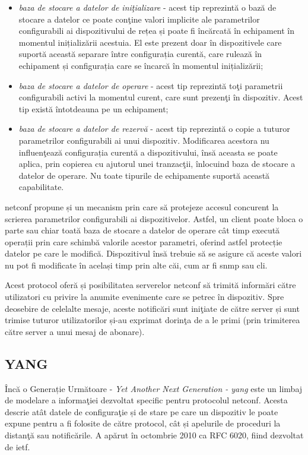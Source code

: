 \begin{itemize}
	\item \textit{baza de stocare a datelor de iniţializare} - acest tip reprezintă o bază de stocare a datelor ce poate conţine valori implicite ale parametrilor configurabili ai dispozitivului de rețea și poate fi încărcată în echipament în momentul inițializării acestuia. El este prezent doar în dispozitivele care suportă această separare între configurația curentă, care rulează în echipament și configurația care se încarcă în momentul inițializării;
	\item \textit{baza de stocare a datelor de operare} - acest tip reprezintă toţi parametrii configurabili activi la momentul curent, care sunt prezenţi în dispozitiv. Acest tip există întotdeauna pe un echipament;
	\item \textit{baza de stocare a datelor de rezervă} - acest tip reprezintă o copie a tuturor parametrilor configurabili ai unui dispozitiv. Modificarea acestora nu influenţează configurația curentă a dispozitivului, însă aceasta se poate aplica, prin copierea cu ajutorul unei tranzacţii, înlocuind baza de stocare a datelor de operare. Nu toate tipurile de echipamente suportă această capabilitate.
\end{itemize}

\gls{netconf} propune și un mecanism prin care să protejeze accesul concurent la scrierea parametrilor configurabili ai dispozitivelor. Astfel, un client poate bloca o parte sau chiar toată baza de stocare a datelor de operare cât timp execută operații prin care schimbă valorile acestor parametri, oferind astfel protecție datelor pe care le modifică. Dispozitivul însă trebuie să se asigure că aceste valori nu pot fi modificate în același timp prin alte căi, cum ar fi \gls{snmp} sau \gls{cli}.

Acest protocol oferă și posibilitatea serverelor \gls{netconf} să trimită informări către utilizatori cu privire la anumite evenimente care se petrec în dispozitiv. Spre deosebire de celelalte mesaje, aceste notificări sunt iniţiate de către server și sunt trimise tuturor utilizatorilor și-au exprimat dorinţa de a le primi (prin trimiterea către server a unui mesaj de abonare). 

\subsection{YANG} 

Încă o Generație Următoare - \textit{Yet Another Next Generation - \gls{yang}} este un limbaj de modelare a informaţiei dezvoltat specific pentru protocolul \gls{netconf}. Acesta descrie atât datele de configuraţie și de stare pe care un dispozitiv le poate expune pentru a fi folosite de către protocol, cât și apelurile de proceduri la distanţă sau notificările. A apărut în octombrie 2010 ca RFC 6020, fiind dezvoltat de \gls{ietf}.

